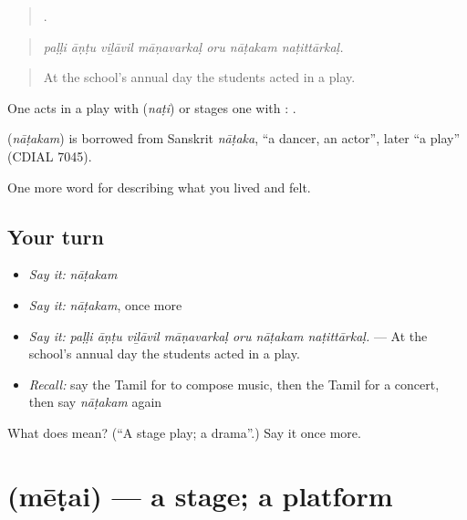 \begin{quote}
      .
\end{quote}

\begin{quote}
\emph{paḷḷi āṇṭu viḻāvil māṇavarkaḷ oru nāṭakam naṭittārkaḷ.}
\end{quote}

\begin{quote}
At the school's annual day the students acted in a play.
\end{quote}

One acts in a play with  (\emph{naṭi}) or stages one with :  .

\begin{cousinweb}
\textbf{} (\emph{nāṭakam}) is borrowed from Sanskrit \emph{nāṭaka}, \textquotedblleft{}a dancer, an actor\textquotedblright{}, later \textquotedblleft{}a play\textquotedblright{} (CDIAL 7045).
\end{cousinweb}

\begin{grammarlens}[title={What you've built}]
One more word for describing what you lived and felt.
\end{grammarlens}

\subsection*{Your turn}
\begin{itemize}
\raggedright
  \item \emph{Say it:} \emph{nāṭakam}
  \item \emph{Say it:} \emph{nāṭakam}, once more
  \item \emph{Say it:} \emph{paḷḷi āṇṭu viḻāvil māṇavarkaḷ oru nāṭakam naṭittārkaḷ.} — At the school's annual day the students acted in a play.
  \item \emph{Recall:} say the Tamil for to compose music, then the Tamil for a concert, then say \emph{nāṭakam} again
\end{itemize}

\begin{tcolorbox}[breakable,colback=teal!4,colframe=teal!35!black,title={Before you move on}]
What does  mean? (\textquotedblleft{}A stage play; a drama\textquotedblright{}.) Say it once more.
\end{tcolorbox}
\section[\texorpdfstring{\ta{மேடை} (mēṭai)}{மேடை (mēṭai)}]{ (mēṭai) — a stage; a platform}

